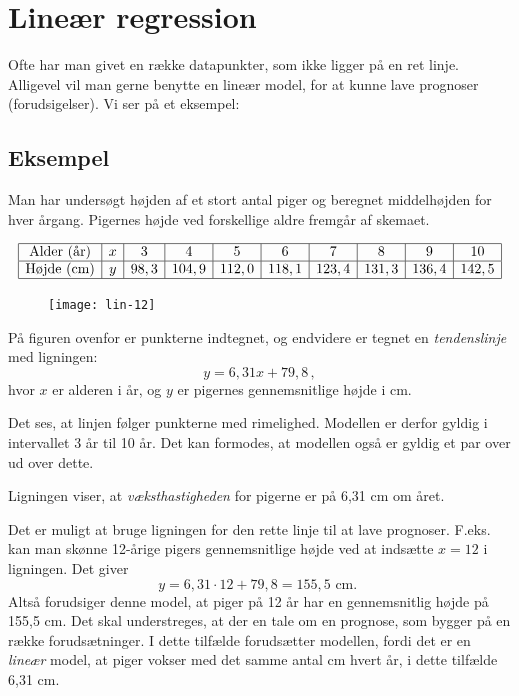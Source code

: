 \documentclass[12pt,oneside,a4paper]{article}
\begin{document}

\section{Lineær regression}
Ofte har man givet en række datapunkter, som ikke ligger på en ret linje.
Alligevel vil man gerne benytte en lineær model, for at kunne lave prognoser
(forudsigelser).  Vi ser på et eksempel:

\subsection{Eksempel}
Man har undersøgt højden af et stort antal piger og beregnet middel\-høj\-den for
hver årgang. Pigernes højde ved forskellige aldre fremgår af skemaet.

\[
\begin{array}{|c|c|c|c|c|c|c|c|c|c|}
    \hline
    \mbox{Alder (år)}& x &  3 &  4 &  5 &  6 &  7 &  8 & 9 & 10 \\
    \hline
    \mbox{Højde (cm)}& y &  98,3 &   104,9 &  112,0 &  118,1 &  123,4 &  131,3 & 136,4 & 142,5\\
    \hline
\end{array}
\]

\begin{figure}[H]
    \centering
    \texttt{[image: lin-12]}
    \caption{}
\end{figure}

På figuren ovenfor er punkterne indtegnet, og endvidere er tegnet en {\em
tendenslinje} med ligningen:
\[
    y = 6,31 x + 79,8 \,,
\]
hvor $x$ er alderen i år, og $y$ er pigernes gennemsnitlige højde i cm.

Det ses, at linjen følger punkterne med rimelighed.  Modellen er derfor gyldig
i intervallet 3 år til 10 år. Det kan formodes, at modellen også er gyldig et
par over ud over dette.

Ligningen viser, at {\em væksthastigheden} for pigerne er på 6,31 cm om året.

Det er muligt at bruge ligningen for den rette linje til at lave prognoser.
F.eks. kan man skønne 12-årige pigers gennemsnitlige højde ved at indsætte
$x=12$ i ligningen. Det giver
\[
    y=6,31\cdot 12 + 79,8 = 155,5 \mbox{ cm. }
\]
Altså forudsiger denne model, at piger på 12 år har en gennemsnitlig
højde på 155,5 cm.  Det skal understreges, at der en tale om en prognose, som
bygger på en række forudsætninger.  I dette tilfælde forudsætter modellen,
fordi det er en {\em lineær} model, at piger vokser med det samme antal cm
hvert år, i dette tilfælde 6,31 cm.
\end{document}
